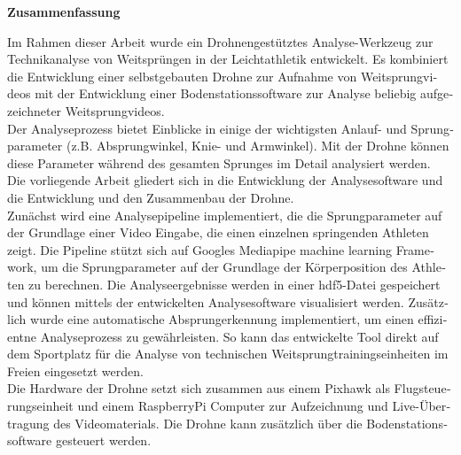 \newpage
\thispagestyle{empty}
\begin{otherlanguage}{german}
\vspace*{\fill}
\begin{center}
        \textbf{Zusammenfassung}
\end{center}
Im Rahmen dieser Arbeit wurde ein Drohnengestütztes Analyse-Werkzeug zur
Technikanalyse von Weitsprüngen in der Leichtathletik entwickelt.
Es kombiniert die Entwicklung einer selbstgebauten Drohne zur Aufnahme von
Weitsprungvideos mit der Entwicklung einer Bodenstationssoftware zur Analyse
beliebig aufgezeichneter Weitsprungvideos.\\
Der Analyseprozess bietet Einblicke in einige der wichtigsten Anlauf- und
Sprungparameter (z.B. Absprungwinkel, Knie- und Armwinkel).
Mit der Drohne können diese Parameter während des gesamten Sprunges im Detail
analysiert werden.\\
Die vorliegende Arbeit gliedert sich in die Entwicklung der Analysesoftware
und die Entwicklung und den Zusammenbau der Drohne.\\
Zunächst wird eine Analysepipeline implementiert, die die Sprungparameter auf
der Grundlage einer Video Eingabe, die einen einzelnen springenden Athleten
zeigt.
Die Pipeline stützt sich auf Googles Mediapipe machine learning Framework, um
die Sprungparameter auf der Grundlage der Körperposition des Athleten zu
berechnen.
Die Analyseergebnisse werden in einer hdf5-Datei gespeichert und können
mittels der entwickelten Analysesoftware visualisiert werden.
Zusätzlich wurde eine automatische Absprungerkennung implementiert, um einen
effizientne Analyseprozess zu gewährleisten.
So kann das entwickelte Tool direkt auf dem Sportplatz für die Analyse von
technischen Weitsprungtrainingseinheiten im Freien eingesetzt werden.\\
Die Hardware der Drohne setzt sich zusammen aus einem Pixhawk als
Flugsteuerungseinheit und einem RaspberryPi Computer zur Aufzeichnung und
Live-Übertragung des Videomaterials.
Die Drohne kann zusätzlich über die Bodenstationssoftware gesteuert werden.
\vfill
\end{otherlanguage}

